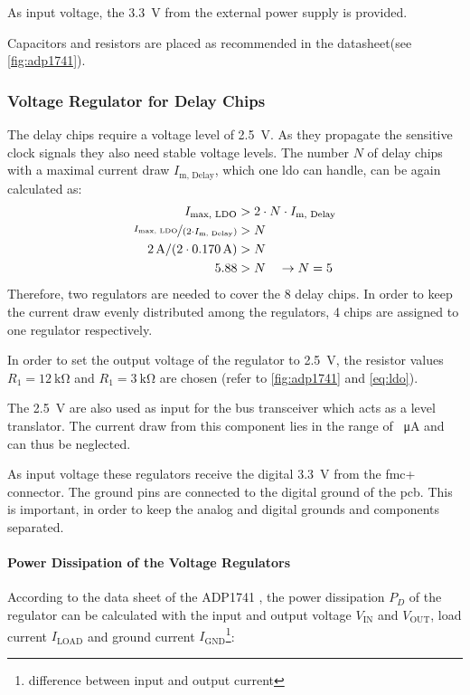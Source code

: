 As input voltage, the \SI{3.3}{\volt} from the external power supply is provided. 

Capacitors and resistors are placed as recommended in the datasheet\cite{adp1741}(see \autoref{fig:adp1741}).

\subsubsection*{Voltage Regulator for Delay Chips}
The delay chips require a voltage level of \SI{2.5}{\volt}. As they propagate the sensitive clock signals they also need stable voltage levels. 
The number $N$ of delay chips with a maximal current draw $I_\text{m, Delay}$, which one \gls{ldo} can handle, can be again calculated as:
\begin{align*}
	I_\text{max, LDO} &> 2 \cdot N \cdot I_\text{m, Delay} \\
	\nicefrac{I_\text{max, LDO}}{(2 \cdot I_\text{m, Delay})} &> N \\
	\SI{2}{\ampere} / (2\cdot \SI{0.170}{\ampere}) &> N \\
	5.88 &> N \quad \rightarrow N = 5	
\end{align*}
Therefore, two regulators are needed to cover the 8 delay chips.
In order to keep the current draw evenly distributed among the regulators, 4 chips are assigned to one regulator respectively.

In order to set the output voltage of the regulator to \SI{2.5}{\volt}, the resistor values $R_1 = \SI{12}{\kilo \ohm}$ and $R_1 = \SI{3}{\kilo \ohm}$ are chosen (refer to \autoref{fig:adp1741} and \autoref{eq:ldo}).

The \SI{2.5}{\volt} are also used as input for the bus transceiver which acts as a level translator. 
The current draw from this component lies in the range of \SI{}{\micro \ampere} and can thus be neglected.

As input voltage these regulators receive the digital \SI{3.3}{\volt} from the \gls{fmc}+ connector.
The ground pins are connected to the digital ground of the \gls{pcb}.
This is important, in order to keep the analog and digital grounds and components separated.

\paragraph{Power Dissipation of the Voltage Regulators}
According to the data sheet of the ADP1741 \cite{adp1741}, the power dissipation $P_D$ of the regulator can be calculated with the input and output voltage $V_\text{IN}$ and $V_\text{OUT}$, load current $I_\text{LOAD}$ and ground current $I_\text{GND}$\footnote{difference between input and output current}:

